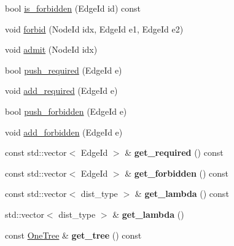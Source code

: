 \begin{DoxyCompactItemize}
\item 
bool \hyperlink{classTSP_1_1BranchingNode_a95ec0c43a5d8aadeb586f76091f945af}{is\+\_\+forbidden} (Edge\+Id id) const
\item 
void \hyperlink{classTSP_1_1BranchingNode_a8944819d3f53e7224f6b73c1842b4f3d}{forbid} (Node\+Id idx, Edge\+Id e1, Edge\+Id e2)
\item 
void \hyperlink{classTSP_1_1BranchingNode_ad4073731142b55b1900e4537f0685301}{admit} (Node\+Id idx)
\item 
bool \hyperlink{classTSP_1_1BranchingNode_ab38488f897b8a3015f31803f2aec5115}{push\+\_\+required} (Edge\+Id e)
\item 
void \hyperlink{classTSP_1_1BranchingNode_ae0afd1a9cf5681b4ade85c1a081f60d9}{add\+\_\+required} (Edge\+Id e)
\item 
bool \hyperlink{classTSP_1_1BranchingNode_a77e84d1567c62587742790f2c985a7df}{push\+\_\+forbidden} (Edge\+Id e)
\item 
void \hyperlink{classTSP_1_1BranchingNode_a12c6b28e2499d4d050aacc31fbb3559c}{add\+\_\+forbidden} (Edge\+Id e)
\item 
\mbox{\label{classTSP_1_1BranchingNode_a24e3bdbd186c0f45b50a37eac2dd118f}} 
const std\+::vector$<$ Edge\+Id $>$ \& {\bfseries get\+\_\+required} () const
\item 
\mbox{\label{classTSP_1_1BranchingNode_a99608bdcd62a8e10b4c9b49600e17cf2}} 
const std\+::vector$<$ Edge\+Id $>$ \& {\bfseries get\+\_\+forbidden} () const
\item 
\mbox{\label{classTSP_1_1BranchingNode_a24dec79e94727ce041847fa534ef73a7}} 
const std\+::vector$<$ dist\+\_\+type $>$ \& {\bfseries get\+\_\+lambda} () const
\item 
\mbox{\label{classTSP_1_1BranchingNode_ad8ecdf94a164b85c69756b1467a65192}} 
std\+::vector$<$ dist\+\_\+type $>$ \& {\bfseries get\+\_\+lambda} ()
\item 
\mbox{\label{classTSP_1_1BranchingNode_a591fc03c255efd9add346275c4729c0e}} 
const \hyperlink{classTSP_1_1OneTree}{One\+Tree} \& {\bfseries get\+\_\+tree} () const
\item 
\mbox{\label{classTSP_1_1BranchingNode_a2a4482a090381ff3b5e4b9faa1d06b60}} 

\end{DoxyCompactItemize}

